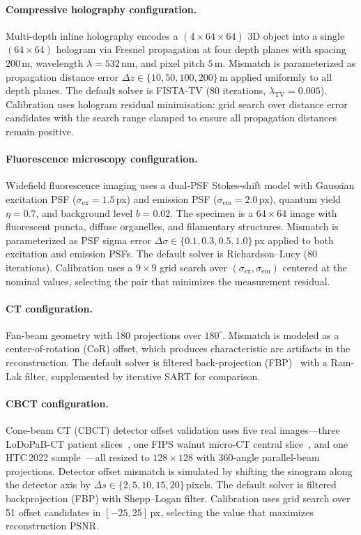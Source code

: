 \documentclass[11pt]{article}
\begin{document}
\paragraph{Compressive holography configuration.}
Multi-depth inline holography encodes a $(4 \times 64 \times 64)$ 3D
object into a single $(64 \times 64)$ hologram via Fresnel propagation at
four depth planes with spacing $200$\,\textmu m, wavelength
$\lambda = 532$\,nm, and pixel pitch $5$\,\textmu m.  Mismatch is
parameterized as propagation distance error
$\Delta z \in \{10, 50, 100, 200\}$\,\textmu m applied uniformly to all
depth planes.  The default solver is FISTA-TV (80 iterations,
$\lambda_{\mathrm{TV}} = 0.005$).  Calibration uses hologram residual
minimisation: grid search over distance error candidates with the search
range clamped to ensure all propagation distances remain positive.

\paragraph{Fluorescence microscopy configuration.}
Widefield fluorescence imaging uses a dual-PSF Stokes-shift model with
Gaussian excitation PSF ($\sigma_{\mathrm{ex}} = 1.5$\,px) and emission
PSF ($\sigma_{\mathrm{em}} = 2.0$\,px), quantum yield $\eta = 0.7$, and
background level $b = 0.02$.  The specimen is a $64 \times 64$ image with
fluorescent puncta, diffuse organelles, and filamentary structures.
Mismatch is parameterized as PSF sigma error
$\Delta\sigma \in \{0.1, 0.3, 0.5, 1.0\}$\,px applied to both excitation
and emission PSFs.  The default solver is Richardson--Lucy (80 iterations).
Calibration uses a $9 \times 9$ grid search over
$(\sigma_{\mathrm{ex}}, \sigma_{\mathrm{em}})$ centered at the nominal
values, selecting the pair that minimizes the measurement residual.

\paragraph{CT configuration.}
Fan-beam geometry with 180 projections over $180^\circ$.  Mismatch is
modeled as a center-of-rotation (CoR) offset, which produces
characteristic arc artifacts in the reconstruction.  The default solver
is filtered back-projection (FBP)~\cite{feldkamp1984practical} with a Ram-Lak filter, supplemented
by iterative SART for comparison.

\paragraph{CBCT configuration.}
Cone-beam CT (CBCT) detector offset validation uses five real images---three
LoDoPaB-CT patient slices~\cite{leuschner2021lodopab}, one FIPS walnut
micro-CT central slice~\cite{hamalainen2015fips}, and one HTC\,2022
sample~\cite{meaney2022htc}---all resized to $128 \times 128$ with
360-angle parallel-beam projections.  Detector offset mismatch is simulated
by shifting the sinogram along the detector axis by
$\Delta s \in \{2, 5, 10, 15, 20\}$\,pixels.  The default solver is
filtered backprojection (FBP) with Shepp--Logan filter.  Calibration uses
grid search over 51 offset candidates in $[-25, 25]$\,px, selecting the
value that maximizes reconstruction PSNR.
\end{document}
